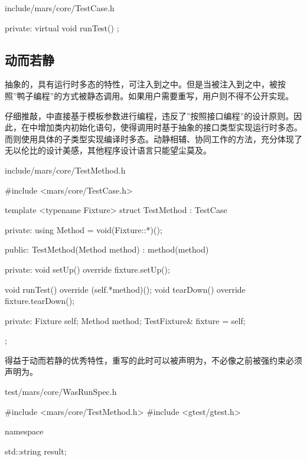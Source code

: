 \begin{content}
\begin{diff}{include/mars/core/TestCase.h}
\begin{minicpp}
{private:
  virtual void runTest() {}
};
  \end{minicpp}
\end{diff}

\subsection{动而若静}

抽象的，具有运行时多态的特性，可注入到之中。但是当被注入到之中，被按照''鸭子编程''的方式被静态调用。如果用户需要重写，用户则不得不公开实现。

仔细推敲，中直接基于模板参数进行编程，违反了''按照接口编程''的设计原则。因此，在中增加类内初始化语句，使得调用时基于抽象的接口类型实现运行时多态。而则使用具体的子类型实现编译时多态。动静相辅、协同工作的方法，充分体现了无以伦比的设计美感，其他程序设计语言只能望尘莫及。

\begin{nodiff}{include/mars/core/TestMethod.h}
 \begin{c++}
#include <mars/core/TestCase.h>

template <typename Fixture>
struct TestMethod : TestCase {
private:
  using Method = void(Fixture::*)();

public:
  TestMethod(Method method)
    : method(method) {}

private:
  void setUp() override {
    fixture.setUp();
  }

  void runTest() override {
    (self.*method)();
  }
  void tearDown() override {
    fixture.tearDown();
  }

private:
  Fixture self;
  Method method;
  TestFixture& fixture = self;
};
  \end{c++}
\end{nodiff}

得益于动而若静的优秀特性，重写的此时可以被声明为，不必像之前被强约束必须声明为。

\begin{nodiff}{test/mars/core/WasRunSpec.h}
 \begin{c++}
#include <mars/core/TestMethod.h>
#include <gtest/gtest.h>

namespace {
  std::string result;

}
\end{c++}
\end{nodiff}
\end{content}
